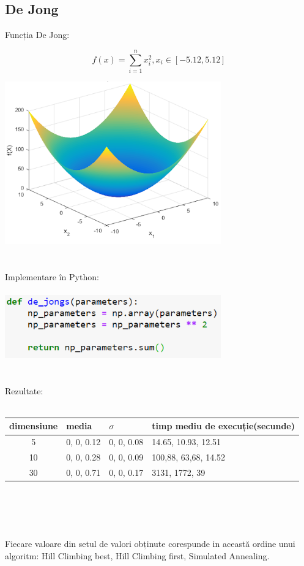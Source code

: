 \documentclass{article}
\begin{document}
\subsection*{De Jong}
Funcția De Jong:

$$ f(x) = \sum_{i=1}^n x_i^2, x_i \in [-5.12, 5.12]$$

\includegraphics[width=0.7\textwidth]{dejong}\\\\\\
Implementare în Python:\\\\
\includegraphics[width=0.7\textwidth]{4a}\\\\\\
Rezultate:\\\\
\begin{tabular}{||c|||l|l|l||}
  \hline
  dimensiune & media & $\sigma$ & timp mediu de execuție(secunde)\\ \hline \hline
  5	  & 0, 0, 0.12 & 0, 0, 0.08 & 14.65, 10.93, 12.51 \\ \hline
  10  & 0, 0, 0.28 & 0, 0, 0.09 & 100,88, 63,68, 14.52 \\ \hline
  30  & 0, 0, 0.71 & 0, 0, 0.17 & 3131, 1772, 39 \\ \hline
\end{tabular}\\\\\\\\
Fiecare valoare din setul de valori obținute corespunde in această ordine unui algoritm: Hill Climbing best, Hill Climbing first, Simulated Annealing.
\end{document}
